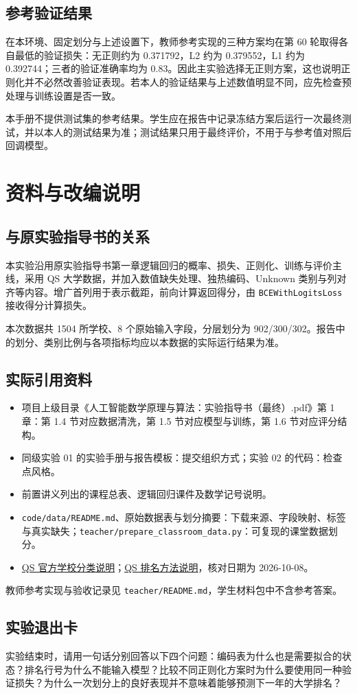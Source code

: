 \documentclass[UTF8,a4paper,11pt,fontset=fandol]{ctexart}
\newcommand{\file}[1]{\nolinkurl{#1}}
\begin{document}
\subsection{参考验证结果}
在本环境、固定划分与上述设置下，教师参考实现的三种方案均在第 60 轮取得各自最低的验证损失：无正则约为 0.371792，L2 约为 0.379552，L1 约为 0.392744；三者的验证准确率均为 0.83。因此主实验选择无正则方案，这也说明正则化并不必然改善验证表现。若本人的验证结果与上述数值明显不同，应先检查预处理与训练设置是否一致。

本手册不提供测试集的参考结果。学生应在报告中记录冻结方案后运行一次最终测试，并以本人的测试结果为准；测试结果只用于最终评价，不用于与参考值对照后回调模型。
\clearpage
\section{资料与改编说明}
\subsection{与原实验指导书的关系}
本实验沿用原实验指导书第一章逻辑回归的概率、损失、正则化、训练与评价主线，采用 QS 大学数据，并加入数值缺失处理、独热编码、Unknown 类别与列对齐等内容。增广首列用于表示截距，前向计算返回得分，由 \texttt{BCEWith\allowbreak{}LogitsLoss} 接收得分计算损失。

本次数据共 1504 所学校、8 个原始输入字段，分层划分为 902/300/302。报告中的划分、类别比例与各项指标均应以本数据的实际运行结果为准。
\subsection{实际引用资料}
\begin{itemize}
\item 项目上级目录《人工智能数学原理与算法：实验指导书（最终）.pdf》第 1 章：第 1.4 节对应数据清洗，第 1.5 节对应模型与训练，第 1.6 节对应评分结构。
\item 同级实验 01 的实验手册与报告模板：提交组织方式；实验 02 的代码：检查点风格。
\item 前置讲义列出的课程总表、逻辑回归课件及数学记号说明。
\item \file{code/data/README.md}、原始数据表与划分摘要：下载来源、字段映射、标签与真实缺失；\file{teacher/prepare_classroom_data.py}：可复现的课堂数据划分。
\item \href{https://support.qs.com/hc/en-gb/articles/360021876820-QS-Institution-Classifications}{QS 官方学校分类说明}；\href{https://www.qs.com/insights/world-university-rankings-methodology}{QS 排名方法说明}，核对日期为 2026-10-08。
\end{itemize}
教师参考实现与验收记录见 \file{teacher/README.md}，学生材料包中不含参考答案。
\subsection{实验退出卡}
实验结束时，请用一句话分别回答以下四个问题：编码表为什么也是需要拟合的状态？排名行号为什么不能输入模型？比较不同正则化方案时为什么要使用同一种验证损失？为什么一次划分上的良好表现并不意味着能够预测下一年的大学排名？
\end{document}
